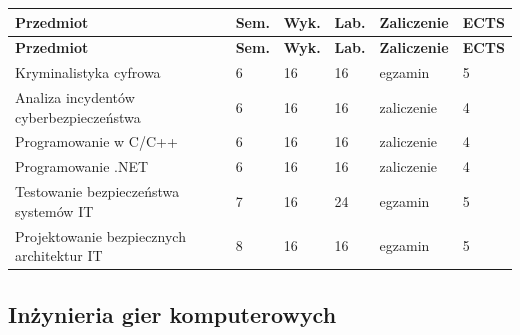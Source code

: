 \documentclass[12pt,a4paper]{article}
\newcommand{\thdrule}{\noalign{\global\setlength{\extrarowheight}{0pt}}}
\newcommand{\thdend}{\noalign{\global\setlength{\extrarowheight}{4pt}}}
\begin{document}
{\scriptsize
\begin{longtable}{m{6.5cm}m{0.7cm}m{1cm}m{1cm}m{1.7cm}m{0.7cm}}
\thdrule\toprule
\rowcolor{pjatkRed}
{\color{white}\footnotesize\textbf{\vphantom{Ag}Przedmiot}} & {\color{white}\footnotesize\textbf{\vphantom{Ag}Sem.}} & {\color{white}\footnotesize\textbf{\vphantom{Ag}Wyk.}} & {\color{white}\footnotesize\textbf{\vphantom{Ag}Lab.}} & {\color{white}\footnotesize\textbf{\vphantom{Ag}Zaliczenie}} & {\color{white}\footnotesize\textbf{\vphantom{Ag}ECTS}} \\
\midrule\thdend
\endfirsthead
\thdrule\toprule
\rowcolor{pjatkRed}
{\color{white}\footnotesize\textbf{\vphantom{Ag}Przedmiot}} & {\color{white}\footnotesize\textbf{\vphantom{Ag}Sem.}} & {\color{white}\footnotesize\textbf{\vphantom{Ag}Wyk.}} & {\color{white}\footnotesize\textbf{\vphantom{Ag}Lab.}} & {\color{white}\footnotesize\textbf{\vphantom{Ag}Zaliczenie}} & {\color{white}\footnotesize\textbf{\vphantom{Ag}ECTS}} \\
\midrule\thdend
\endhead
\rowcolor{tableRowLight} Kryminalistyka cyfrowa & 6 & 16 & 16 & {\scriptsize egzamin} & 5 \\
\rowcolor{tableRowAlt} Analiza incydentów cyberbezpieczeństwa & 6 & 16 & 16 & {\scriptsize zaliczenie} & 4 \\
\rowcolor{tableRowLight} Programowanie w C/C++ & 6 & 16 & 16 & {\scriptsize zaliczenie} & 4 \\
\rowcolor{tableRowAlt} Programowanie .NET & 6 & 16 & 16 & {\scriptsize zaliczenie} & 4 \\
\rowcolor{tableRowLight} Testowanie bezpieczeństwa systemów IT & 7 & 16 & 24 & {\scriptsize egzamin} & 5 \\
\rowcolor{tableRowAlt} Projektowanie bezpiecznych architektur IT & 8 & 16 & 16 & {\scriptsize egzamin} & 5 \\
\bottomrule
\end{longtable}}

\subsection*{Inżynieria gier komputerowych}
\end{document}
